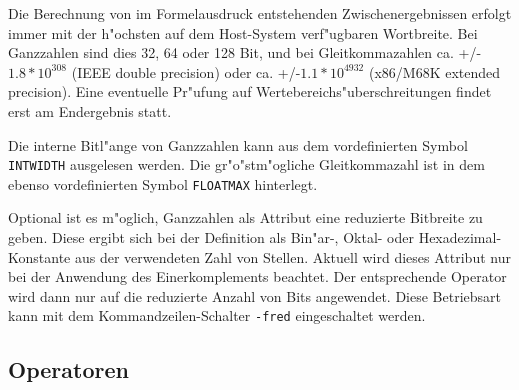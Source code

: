 \documentclass[12pt,a4paper,twoside]{report}
\newcommand{\tty}[1]{{\tt #1}}
\begin{document}
Die Berechnung von im Formelausdruck entstehenden Zwischenergebnissen
erfolgt immer mit der h"ochsten auf dem Host-System verf"ugbaren Wortbreite.
Bei Ganzzahlen sind dies 32, 64 oder 128 Bit, und bei Gleitkommazahlen
ca. +/-$1.8*10^{308}$ (IEEE double precision) oder ca. +/-$1.1*10^{4932}$
(x86/M68K extended precision).  Eine eventuelle Pr"ufung auf
Wertebereichs"uberschreitungen findet erst am Endergebnis statt.

Die interne Bitl"ange von Ganzzahlen kann aus dem vordefinierten Symbol
\tty{INTWIDTH} ausgelesen werden.  Die gr"o"stm"ogliche Gleitkommazahl
ist in dem ebenso vordefinierten Symbol \tty{FLOATMAX} hinterlegt.

Optional ist es m"oglich, Ganzzahlen als Attribut eine reduzierte
Bitbreite zu geben.  Diese ergibt sich bei der Definition als Bin"ar-,
Oktal- oder Hexadezimal-Konstante aus der verwendeten Zahl von Stellen.  Aktuell
wird dieses Attribut nur bei der Anwendung des Einerkomplements beachtet.
Der entsprechende Operator wird dann nur auf die reduzierte Anzahl von
Bits angewendet.  Diese Betriebsart kann mit dem Kommandzeilen-Schalter
\tty{-fred} eingeschaltet werden.

\subsection{Operatoren}
\end{document}
